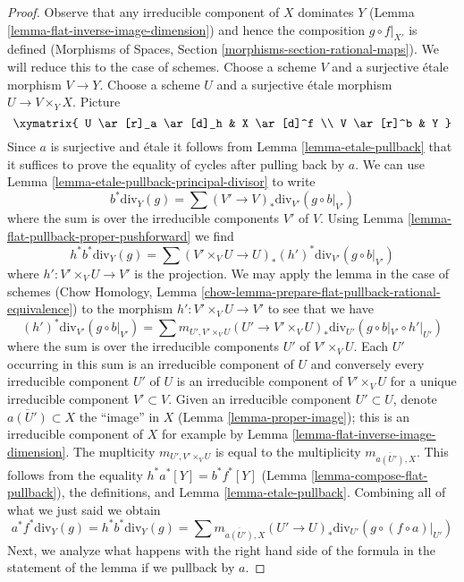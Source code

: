 \begin{proof}
Observe that any irreducible component of $X$ dominates $Y$
(Lemma \ref{lemma-flat-inverse-image-dimension})
and hence the composition $g \circ f|_{X'}$ is defined
(Morphisms of Spaces, Section \ref{morphisms-section-rational-maps}).
We will reduce this to the case of schemes. Choose a scheme $V$ and a
surjective \'etale morphism $V \to Y$. Choose a scheme $U$ and a surjective
\'etale morphism $U \to V \times_Y X$. Picture
$$
\xymatrix{
U \ar[r]_a \ar[d]_h & X \ar[d]^f \\
V \ar[r]^b & Y
}
$$
Since $a$ is surjective and \'etale it follows from
Lemma \ref{lemma-etale-pullback} that it suffices to prove the
equality of cycles after pulling back by $a$.
We can use Lemma \ref{lemma-etale-pullback-principal-divisor} to write
$$
b^*\text{div}_Y(g) = \sum (V' \to V)_*\text{div}_{V'}(g \circ b|_{V'})
$$
where the sum is over the irreducible components $V'$ of $V$.
Using Lemma \ref{lemma-flat-pullback-proper-pushforward} we find
$$
h^*b^*\text{div}_Y(g) =
\sum (V' \times_V U \to U)_*(h')^*\text{div}_{V'}(g \circ b|_{V'})
$$
where $h' : V' \times_V U \to V'$ is the projection.
We may apply the lemma in the case of schemes
(Chow Homology, Lemma
\ref{chow-lemma-prepare-flat-pullback-rational-equivalence})
to the morphism $h' : V' \times_V U \to V'$ to see that we have
$$
(h')^*\text{div}_{V'}(g \circ b|_{V'}) =
\sum
m_{U', V' \times_V U}
(U' \to V' \times_V U)_*\text{div}_{U'}(g \circ b|_{V'} \circ h'|_{U'})
$$
where the sum is over the irreducible components $U'$ of $V' \times_V U$.
Each $U'$ occurring in this sum is an irreducible component of $U$
and conversely every irreducible component $U'$ of $U$ is an
irreducible component of $V' \times_V U$
for a unique irreducible component $V' \subset V$.
Given an irreducible component $U' \subset U$,
denote $\overline{a(U')} \subset X$ the ``image'' in $X$
(Lemma \ref{lemma-proper-image}); this
is an irreducible component of $X$ for example by
Lemma \ref{lemma-flat-inverse-image-dimension}.
The muplticity $m_{U', V' \times_V U}$ is equal to
the multiplicity $m_{\overline{a(U')}, X}$.
This follows from the equality $h^*a^*[Y] = b^*f^*[Y]$
(Lemma \ref{lemma-compose-flat-pullback}), the definitions, and
Lemma \ref{lemma-etale-pullback}.
Combining all of what we just said we obtain
$$
a^*f^*\text{div}_Y(g) =
h^*b^*\text{div}_Y(g) =
\sum m_{\overline{a(U')}, X}
(U' \to U)_*\text{div}_{U'}(g \circ (f \circ a)|_{U'})
$$
Next, we analyze what happens with the right hand side of the
formula in the statement of the lemma if we pullback by $a$.

\end{proof}
